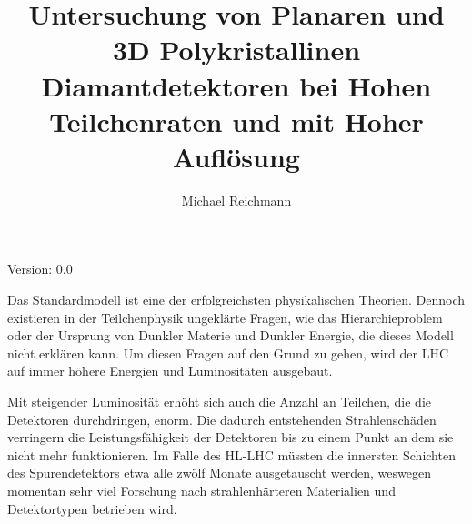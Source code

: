 \documentclass[12pt, a4paper]{article}
\title{Untersuchung von Planaren und 3D Polykristallinen Diamantdetektoren bei Hohen Teilchenraten und mit Hoher Auflösung}
\author{Michael Reichmann}
\institute{Institut für Teilchen- und Astrophysik, Eidgenössische Technische Hochschule Zürich}
\makeatletter
\newcommand*{\@version}{0.0}
\makeatother
\begin{document}
{\flushright Version: \@version\par}
{\Large\bfseries\@title\par}
{\scshape\@author\par}
{\slshape\@institute\par}\vspace*{1.5cm}

Das Standardmodell ist eine der erfolgreichsten physikalischen Theorien. Dennoch existieren in der Teilchenphysik ungeklärte Fragen, wie das Hierarchieproblem oder der Ursprung von Dunkler Materie und Dunkler Energie, die dieses Modell nicht erklären kann. Um diesen Fragen auf den Grund zu gehen, wird der \ac{LHC} auf immer höhere Energien und Luminositäten ausgebaut.\par
Mit steigender Luminosität erhöht sich auch die Anzahl an Teilchen, die die Detektoren durchdringen, enorm. Die dadurch entstehenden Strahlenschäden verringern die Leistungsfähigkeit der Detektoren bis zu einem Punkt an dem sie nicht mehr funktionieren. Im Falle des \ac{HL-LHC} müssten die innersten Schichten des Spurendetektors etwa alle zwölf Monate ausgetauscht werden, weswegen momentan sehr viel Forschung nach strahlenhärteren Materialien und Detektortypen betrieben wird.\par

	
	
	
\end{document}
